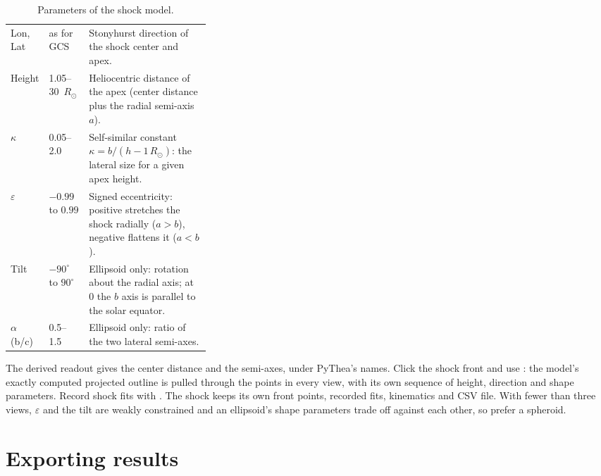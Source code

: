 \begin{table}[!htbp]
  \centering
  \caption{Parameters of the shock model.}
  \label{tab:shock-model-params}
  \small
  \begin{tabularx}{\linewidth}{@{}P{0.13\linewidth}P{0.2\linewidth}L@{}}
    \toprule
     &  &  \\
    \midrule
    Lon, Lat & as for GCS & Stonyhurst direction of the shock center and apex. \\
    Height & 1.05--30~\(R_\odot\) & Heliocentric distance of the apex (center distance plus the radial semi-axis \(a\)). \\
    \(\kappa\) & 0.05--2.0 & Self-similar constant \(\kappa = b/(h - 1\,R_\odot)\): the lateral size for a given apex height. \\
    \(\varepsilon\) & \(-0.99\) to \(0.99\) & Signed eccentricity: positive stretches the shock radially (\(a > b\)), negative flattens it (\(a < b\)). \\
    Tilt & \(-90^\circ\) to \(90^\circ\) & Ellipsoid only: rotation about the radial axis; at 0 the \(b\) axis is parallel to the solar equator. \\
    \(\alpha\) (b/c) & 0.5--1.5 & Ellipsoid only: ratio of the two lateral semi-axes. \\
    \bottomrule
  \end{tabularx}
\end{table}


The derived readout gives the center distance and the semi-axes, under PyThea's names. Click the
shock front and use : the model's exactly computed projected outline is pulled
through the points in every view, with its own sequence of height, direction and shape
parameters. Record shock fits with . The shock keeps its own front points,
recorded fits, kinematics and CSV file. With fewer than three views, \(\varepsilon\) and the tilt
are weakly constrained and an ellipsoid's shape parameters trade off against each other, so
prefer a spheroid.

\section{Exporting results}
\label{sec:gcs-export}

